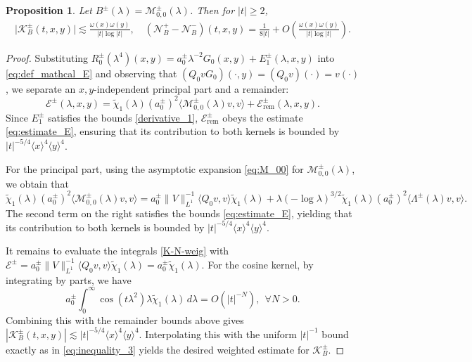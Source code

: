 \documentclass[reqno]{amsart}
\newtheorem{proposition}[theorem]{Proposition}
\numberwithin{equation}{section}
\begin{document}
\begin{proposition}\label{prop_K_weight_2}
	Let $B^\pm(\lambda)=\mathcal{M}_{0,0}^\pm(\lambda)$. Then for $|t| \ge 2$,
	\begin{align}\label{K-N-cri}
		\bigl|\mathcal{K}_{B}^\pm(t,x,y)\bigr|  \lesssim \frac{\omega(x)\omega(y)}{|t|\log|t|},  \quad
		(\mathcal{N}_{B}^+ - \mathcal{N}_{B}^-)(t,x,y)= \frac{1}{8|t|} +O\left(\frac{\omega(x)\omega(y)}{|t|\log|t|}\right).
	\end{align}
\end{proposition}

\begin{proof}
	Substituting  $R_0^{\pm}(\lambda^4)(x,y) = a_0^{\pm} \lambda^{-2}G_0(x,y) + E_1^{\pm}(\lambda,x,y)$ into \eqref{eq:def_mathcal_E} and observing that $(Q_0vG_0)(\cdot,y)=(Q_0v)(\cdot)=v(\cdot)$, we separate an $x,y$-independent principal part and a remainder:
	\[
	\mathcal{E}^\pm(\lambda,x,y) = \widetilde{\chi}_1(\lambda) (a_0^\pm)^2 \bigl\langle \mathcal{M}_{0,0}^\pm(\lambda) v, v \bigr\rangle + \mathcal{E}_{\mathrm{rem}}^\pm(\lambda,x,y).
	\]
	Since $E_1^\pm$ satisfies the bounds \eqref{derivative_1}, $\mathcal{E}_{\mathrm{rem}}^\pm$ obeys the estimate \eqref{eq:estimate_E}, ensuring that its contribution to both kernels is bounded by $|t|^{-5/4}\langle x\rangle^4\langle y\rangle^4$.
	
	For the principal part, using the asymptotic expansion \eqref{eq:M_00} for $\mathcal{M}_{0,0}^\pm(\lambda)$, we obtain that
	\[
	\widetilde{\chi}_1(\lambda) (a_0^\pm)^2 \bigl\langle \mathcal{M}_{0,0}^\pm(\lambda) v, v \bigr\rangle = a_0^\pm \|V\|_{L^1}^{-1} \bigl\langle Q_0 v, v \bigr\rangle \widetilde{\chi}_1(\lambda) + \lambda (-\log \lambda)^{3/2} \widetilde{\chi}_1(\lambda) (a_0^\pm)^2 \bigl\langle \Lambda^{\pm}(\lambda) v, v \bigr\rangle.
	\]
	The second term on the right satisfies the bounds \eqref{eq:estimate_E}, yielding that its contribution to both kernels is bounded by $|t|^{-5/4}\langle x\rangle^4\langle y\rangle^4$.
	
	It remains to evaluate the integrals  \eqref{K-N-weig} with  $\mathcal{E}^\pm=a_0^\pm \|V\|_{L^1}^{-1} \bigl\langle Q_0 v, v \bigr\rangle\widetilde{\chi}_1(\lambda)=a_0^\pm\widetilde{\chi}_1(\lambda)$. For the cosine kernel,  by integrating by parts, we have
	\[
	a_0^\pm \int_0^\infty \cos(t\lambda^2)\lambda\widetilde{\chi}_1(\lambda)\,d\lambda  = O(|t|^{-N}),  \ \  \forall N>0.
	\]
	Combining this with the remainder bounds above gives $|\mathcal{K}_{B}^\pm(t,x,y)| \lesssim |t|^{-5/4}\langle x\rangle^4\langle y\rangle^4$. Interpolating this with the uniform $|t|^{-1}$ bound exactly as in \eqref{eq:inequality_3} yields the desired weighted estimate for $\mathcal{K}_{B}^\pm$.
	

\end{proof}
\end{document}
